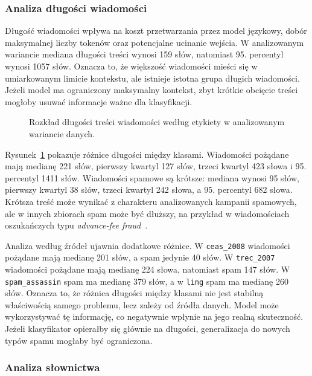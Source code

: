 \subsubsection{Analiza długości wiadomości}

Długość wiadomości wpływa na koszt przetwarzania przez model językowy, dobór maksymalnej liczby tokenów oraz
potencjalne ucinanie wejścia. W analizowanym wariancie mediana długości treści wynosi
159 słów, natomiast 95. percentyl wynosi 1057 słów. Oznacza to, że większość
wiadomości mieści się w umiarkowanym limicie kontekstu, ale istnieje istotna
grupa długich wiadomości. Jeżeli model ma ograniczony maksymalny kontekst, zbyt
krótkie obcięcie treści mogłoby usuwać informacje ważne dla klasyfikacji.

\begin{figure}[htbp]
\centering

\caption{Rozkład długości treści wiadomości według etykiety w analizowanym
wariancie danych.}
\label{fig:body-word-count-boxplot}
\end{figure}

Rysunek~\ref{fig:body-word-count-boxplot} pokazuje różnice długości między
klasami. Wiadomości pożądane mają medianę 221 słów, pierwszy kwartyl 127 słów,
trzeci kwartyl 423 słowa i 95. percentyl 1411 słów. Wiadomości spamowe są
krótsze: mediana wynosi 95 słów, pierwszy kwartyl 38 słów, trzeci kwartyl
242 słowa, a 95. percentyl 682 słowa. Krótsza treść może wynikać z charakteru analizowanych kampanii spamowych,
ale w innych zbiorach spam może być dłuższy, na przykład w wiadomościach oszukańczych typu
\emph{advance-fee fraud}~\autocite{advance-fee-fraud}.

Analiza według źródeł ujawnia dodatkowe różnice. W \texttt{ceas\_2008}
wiadomości pożądane mają medianę 201 słów, a spam jedynie 40 słów. W
\texttt{trec\_2007} wiadomości pożądane mają medianę 224 słowa, natomiast spam
147 słów. W \texttt{spam\_assassin} spam ma medianę 379 słów, a w
\texttt{ling} spam ma medianę 260 słów. Oznacza
to, że różnica długości między klasami nie jest stabilną właściwością samego
problemu, lecz zależy od źródła danych. Model może wykorzystywać tę informację,
co negatywnie wpłynie na jego realną skuteczność. Jeżeli klasyfikator opierałby
się głównie na długości, generalizacja do nowych typów spamu mogłaby być
ograniczona.

\subsubsection{Analiza słownictwa}

